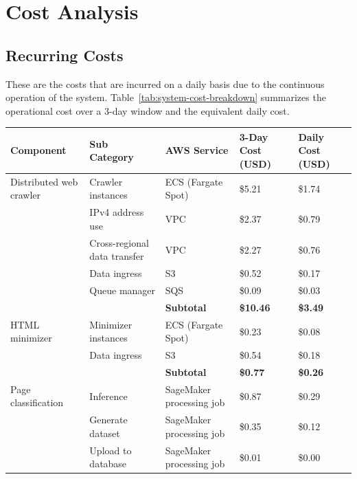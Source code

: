 \section{Cost Analysis}\label{sec:cost_analysis}

\subsection{Recurring Costs}\label{subsec:recurring-costs}
These are the costs that are incurred on a daily basis due to the continuous operation of the system.
Table~\ref{tab:system-cost-breakdown} summarizes the operational cost over a 3-day window and the equivalent daily cost.

\begin{table}[t]
    \centering
    \scriptsize
    \renewcommand{\arraystretch}{1.1}
    \begin{tabularx}{\textwidth}{p{2.9cm} p{3.8cm} p{3.3cm} >{\raggedleft\arraybackslash}p{2.2cm} >{\raggedleft\arraybackslash}p{2.1cm}}
        \toprule
        \textbf{Component} & \textbf{Sub Category} & \textbf{AWS Service} & \textbf{3-Day Cost (USD)} & \textbf{Daily Cost (USD)} \\
        \midrule
        Distributed web crawler & Crawler instances & ECS (Fargate Spot) & \$5.21 & \$1.74 \\
         & IPv4 address use & VPC & \$2.37 & \$0.79 \\
         & Cross-regional data transfer & VPC & \$2.27 & \$0.76 \\
         & Data ingress & S3 & \$0.52 & \$0.17 \\
         & Queue manager & SQS & \$0.09 & \$0.03 \\
        \midrule
         &  & \textbf{Subtotal} & \textbf{\$10.46} & \textbf{\$3.49} \\
        \midrule
        HTML minimizer & Minimizer instances & ECS (Fargate Spot) & \$0.23 & \$0.08 \\
         & Data ingress & S3 & \$0.54 & \$0.18 \\
        \midrule
         &  & \textbf{Subtotal} & \textbf{\$0.77} & \textbf{\$0.26} \\
        \midrule
        Page classification & Inference & SageMaker processing job & \$0.87 & \$0.29 \\
         & Generate dataset & SageMaker processing job & \$0.35 & \$0.12 \\
         & Upload to database & SageMaker processing job & \$0.01 & \$0.00 \\

\end{tabularx}
\end{table}
